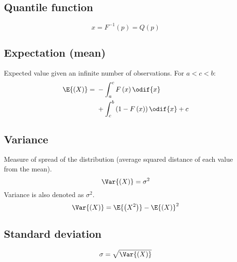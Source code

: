\documentclass{article}
\begin{document}
\begin{minipage}{126.1962963mm}
\begin{multicols}{2}
        \subsection{Quantile function}
        \begin{equation*}
            x = F^{-1}\left( p \right) = Q\left( p \right)
        \end{equation*}
        \subsection{Expectation (mean)}
        Expected value given an infinite number of observations. For \(a < c < b\):
        \begin{equation*}
            \E{\left(X\right)} = \begin{aligned}[t]
                 & -\int_{a}^c F\left( x \right) \odif{x}                     \\
                 & + \int_c^b \left(1 - F\left( x \right)\right) \odif{x} + c
            \end{aligned}
        \end{equation*}
        \subsection{Variance}
        Measure of spread of the distribution (average squared distance of each value from the mean).
        \begin{equation*}
            \Var{\left( X \right)} = \sigma^2
        \end{equation*}
        Variance is also denoted as \(\sigma^2\).
        \begin{equation*}
            \Var{\left( X \right)} = \E{\left( X^2 \right)} - \E{\left( X \right)}^2
        \end{equation*}
        \subsection{Standard deviation}
        \begin{equation*}
            \sigma = \sqrt{\Var{\left( X \right)}}
        \end{equation*}
    \end{multicols}
\end{minipage}\hfill%
\end{document}
